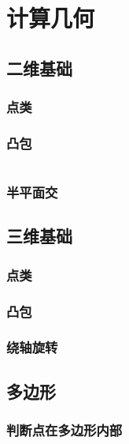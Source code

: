\documentclass[a4paper]{article}
\newcommand{\cppcode}[1]{
    \inputminted[mathescape]{cpp}{source/#1}
}
\begin{document}
\cppcode{string-manipulation/minimum-circular-representation.cpp}

\section{计算几何}

\subsection{二维基础}

\subsubsection{点类}

\subsubsection{凸包}

\cppcode{computational-geometry/convex-hull.cpp}

\subsubsection{半平面交}

\subsection{三维基础}

\subsubsection{点类}

\subsubsection{凸包}

\subsubsection{绕轴旋转}

\subsection{多边形}

\subsubsection{判断点在多边形内部}
\end{document}
